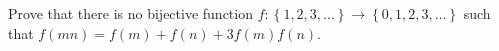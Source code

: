 Prove that there is no bijective function $f : \left\{1,2,3,\ldots \right\}\rightarrow \left\{0,1,2,3,\ldots \right\}$ such that $f(mn)=f(m)+f(n)+3f(m)f(n)$.